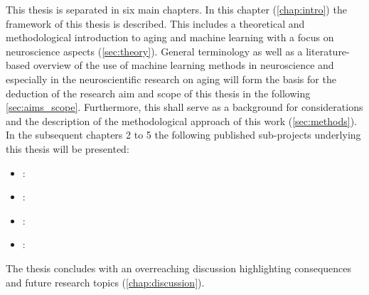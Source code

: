 This thesis is separated in six main chapters. In this chapter (\autoref{chap:intro}) the framework of this thesis is described. This includes a theoretical and methodological introduction to aging and machine learning with a focus on neuroscience aspects (\autoref{sec:theory}). General terminology as well as a literature-based overview of the use of machine learning methods in neuroscience and especially in the neuroscientific research on aging will form the basis for the deduction of the research aim and scope of this thesis in the following \autoref{sec:aims_scope}. Furthermore, this shall serve as a background for considerations and the description of the methodological approach of this work (\autoref{sec:methods}). In the subsequent chapters 2 to 5 the following published sub-projects underlying this thesis will be presented:

\begin{itemize}
\item {}: 
\item {}: 
\item {}: 
\item {}: 
\end{itemize}

The thesis concludes with an overreaching discussion highlighting consequences and future research topics (\autoref{chap:discussion}).
